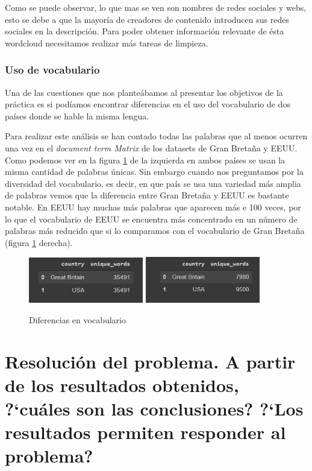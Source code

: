 \documentclass[a4paper,12pt]{article}
\begin{document}
Como se puede observar, lo que mas se ven son nombres de redes sociales y webs, esto se debe a que la mayor\'ia de creadores de contenido introducen sus redes sociales en la descripci\'on. Para poder obtener informaci\'on relevante de \'esta wordcloud necesitamos realizar m\'as tareas de limpieza.

\subsubsection{Uso de vocabulario}
Una de las cuestiones que nos planteábamos al presentar los objetivos de la pr\'actica es si pod\'iamos encontrar diferencias en el uso del vocabulario de dos pa\'ises donde se hable la misma lengua.

Para realizar este an\'alisis se han contado todas las palabras que al menos ocurren una vez en el {\itshape document term Matrix} de los datasets de Gran Breta\~na y EEUU. Como podemos ver en la figura \ref{fig:voc} de la izquierda en ambos pa\'ises se usan la misma cantidad de palabras \'unicas. Sin embargo cuando nos preguntamos por la diversidad del vocabulario, es decir, en que pa\'is se usa una variedad m\'as amplia de palabras vemos que la diferencia entre Gran Breta\~na y EEUU es bastante notable. En EEUU hay muchas m\'as palabras que aparecen m\'as e 100 veces, por lo que el vocabulario de EEUU se encuentra m\'as concentrado en un n\'umero de palabras m\'as reducido que si lo comparamos con el vocabulario de Gran Breta\~na (figura \ref{fig:voc} derecha). 


\begin{figure}[h!]
\centering

\includegraphics[width=5cm]{coc_comp.JPG}
\includegraphics[width=5cm]{dif_voc.JPG}
\caption{Diferencias en vocabulario}
\label{fig:voc}
\end{figure}

\section[item_conclusiones]{Resoluci\'on del problema. A partir de los resultados obtenidos, ?`cu\'ales son las conclusiones? ?`Los resultados permiten responder al problema?}
\end{document}

